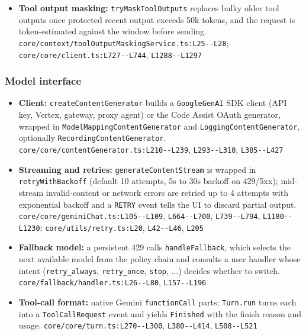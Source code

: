 \begin{itemize}
\item \textbf{Tool output masking:} \texttt{tryMaskToolOutputs} replaces bulky older tool outputs once protected recent output exceeds 50k tokens, and the request is token-estimated against the window before sending. \texttt{core/\allowbreak{}context/\allowbreak{}toolOutputMaskingService.\allowbreak{}ts:\allowbreak{}L25-\allowbreak{}-\allowbreak{}L28}; \texttt{core/\allowbreak{}core/\allowbreak{}client.\allowbreak{}ts:\allowbreak{}L727-\allowbreak{}-\allowbreak{}L744}, \texttt{L1288-\allowbreak{}-\allowbreak{}L1297}
\end{itemize}

\subsubsection*{Model interface}
\begin{itemize}
\item \textbf{Client:} \texttt{createContentGenerator} builds a \texttt{GoogleGenAI} SDK client (API key, Vertex, gateway, proxy agent) or the Code Assist OAuth generator, wrapped in \texttt{ModelMappingContentGenerator} and \texttt{LoggingContentGenerator}, optionally \texttt{RecordingContentGenerator}. \texttt{core/\allowbreak{}core/\allowbreak{}contentGenerator.\allowbreak{}ts:\allowbreak{}L210-\allowbreak{}-\allowbreak{}L239}, \texttt{L293-\allowbreak{}-\allowbreak{}L310}, \texttt{L385-\allowbreak{}-\allowbreak{}L427}
\item \textbf{Streaming and retries:} \texttt{generateContentStream} is wrapped in \texttt{retryWithBackoff} (default 10 attempts, 5s to 30s backoff on 429/5xx); mid-stream invalid-content or network errors are retried up to 4 attempts with exponential backoff and a \texttt{RETRY} event tells the UI to discard partial output. \texttt{core/\allowbreak{}core/\allowbreak{}geminiChat.\allowbreak{}ts:\allowbreak{}L105-\allowbreak{}-\allowbreak{}L109}, \texttt{L664-\allowbreak{}-\allowbreak{}L700}, \texttt{L739-\allowbreak{}-\allowbreak{}L794}, \texttt{L1180-\allowbreak{}-\allowbreak{}L1230}; \texttt{core/\allowbreak{}utils/\allowbreak{}retry.\allowbreak{}ts:\allowbreak{}L20}, \texttt{L42-\allowbreak{}-\allowbreak{}L46}, \texttt{L205}
\item \textbf{Fallback model:} a persistent 429 calls \texttt{handleFallback}, which selects the next available model from the policy chain and consults a user handler whose intent (\texttt{retry\_\allowbreak{}always}, \texttt{retry\_\allowbreak{}once}, \texttt{stop}, ...) decides whether to switch. \texttt{core/\allowbreak{}fallback/\allowbreak{}handler.\allowbreak{}ts:\allowbreak{}L26-\allowbreak{}-\allowbreak{}L80}, \texttt{L157-\allowbreak{}-\allowbreak{}L196}
\item \textbf{Tool-call format:} native Gemini \texttt{functionCall} parts; \texttt{Turn.\allowbreak{}run} turns each into a \texttt{ToolCallRequest} event and yields \texttt{Finished} with the finish reason and usage. \texttt{core/\allowbreak{}core/\allowbreak{}turn.\allowbreak{}ts:\allowbreak{}L270-\allowbreak{}-\allowbreak{}L300}, \texttt{L380-\allowbreak{}-\allowbreak{}L414}, \texttt{L508-\allowbreak{}-\allowbreak{}L521}
\end{itemize}

